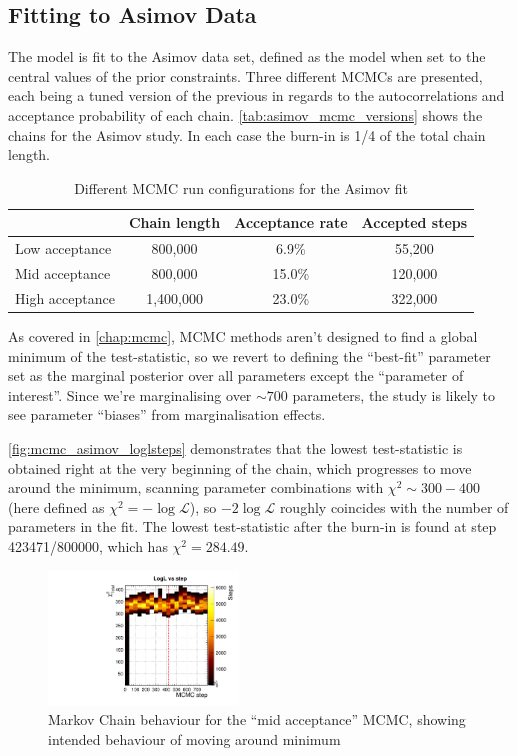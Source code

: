 \subsection{Fitting to Asimov Data}
\label{sec:asimov_fit}
The model is fit to the Asimov data set, defined as the model when set to the central values of the prior constraints. Three different MCMCs are presented, each being a tuned version of the previous in regards to the autocorrelations and acceptance probability of each chain. \autoref{tab:asimov_mcmc_versions} shows the chains for the Asimov study. In each case the burn-in is 1/4 of the total chain length.
\begin{table}[h]
	\centering
	\begin{tabular}{l | c c c}
		\hline
		\hline
							& Chain length  & Acceptance rate & Accepted steps\\
							\hline
		Low acceptance		& 800,000		& 6.9\% 		  & 55,200 \\
		Mid acceptance		& 800,000		& 15.0\% 		  & 120,000\\
		High acceptance		& 1,400,000		& 23.0\%  		  & 322,000 \\
		\hline
		\hline
	\end{tabular}
\caption{Different MCMC run configurations for the Asimov fit}
\label{tab:asimov_mcmc_versions}
\end{table}

As covered in \autoref{chap:mcmc}, MCMC methods aren't designed to find a global minimum of the test-statistic, so we revert to defining the ``best-fit'' parameter set as the marginal posterior over all parameters except the ``parameter of interest''. Since we're marginalising over $\sim700$ parameters, the study is likely to see parameter ``biases'' from marginalisation effects.

\autoref{fig:mcmc_asimov_loglsteps} demonstrates that the lowest test-statistic is obtained right at the very beginning of the chain, which progresses to move around the minimum, scanning parameter combinations with $\chi^2 \sim 300-400$ (here defined as $\chi^2 = -\log\mathcal{L}$), so $-2\log\mathcal{L}$ roughly coincides with the number of parameters in the fit. The lowest test-statistic after the burn-in is found at step 423471/800000, which has $\chi^2 = 284.49$.
\begin{figure}[h]
	\includegraphics[width=0.45\textwidth]{figures/mach3/mcmc/2017b_NewDet_3Xsec_4Det_5Flux_NewXSecTune_Asimov_merge}
	\caption{Markov Chain behaviour for the ``mid acceptance'' MCMC, showing intended behaviour of moving around minimum}
	\label{fig:mcmc_asimov_loglsteps}
\end{figure}

